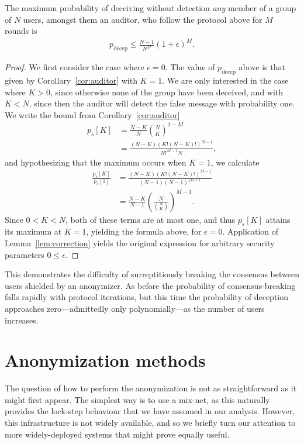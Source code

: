\documentclass[USenglish]{llncs}
\begin{document}
\begin{theorem}\label{thm:transfer-group}
	The maximum probability of deceiving without detection \emph{any} member
	of a group of $N$ users, amongst them an auditor, who follow the
	protocol above for $M$ rounds is
	\begin{align}
		p_\mathrm{decep} \le \frac{N-1}{N^M} (1+\epsilon)^M .
	\end{align}
	\begin{proof}
		We first consider the case where $\epsilon = 0$.
		The value of $p_\mathrm{decep}$ above is that given by
		Corollary~\ref{cor:auditor} with $K = 1$.  We are only interested
		in the case where $K > 0$, since otherwise
		none of the group have been deceived, and with $K < N$,
		since then the auditor will detect the false message with
		probability one.  We write the bound from Corollary~\ref{cor:auditor}
		\begin{align}
			p_s[K] &= \frac{N-K}{N} {N \choose K}^{1-M} \\
			&= \frac{(N-K)(K! (N-K)!)^{M-1}}{N!^{M-1} N} ,
		\end{align}
		and hypothesizing that the maximum occurs
		when $K = 1$, we calculate
		\begin{align}
			\frac{p_s[K]}{p_s[1]}  &= \frac{(N-K)\left(K! (N-K)!\right) ^ {M-1}}{(N-1)(N-1)!^{M-1}} \\
			&= \frac{N-K}{N-1} \left(\frac{N}{{N \choose K}}\right)^{M-1} .
		\end{align}
		Since $0 < K < N$, both of these terms are at most one, and thus $p_s[K]$
		attains its maximum at $K = 1$, yielding the formula above, for $\epsilon = 0$.
		Application of Lemma~\ref{lem:correction} yields the original expression for
arbitrary security parameters $0 \le \epsilon$.
	\end{proof}
\end{theorem}

This demonstrates the difficulty of surreptitiously breaking the consensus between users shielded
by an anonymizer.  As before the probability of consensus-breaking falls rapidly
with protocol iterations, but this time the probability of deception approaches
zero---admittedly only polynomially---as the number of users increases.

\section{Anonymization methods}\label{sec:anonymization}

The question of how to perform the anonymization is not as straightforward
as it might first appear.  The simplest way is to use a mix-net, as this naturally
provides the lock-step behaviour that we have assumed in our analysis.
However, this infrastructure is not widely available, and so we briefly turn our
attention to more widely-deployed systems that might prove equally useful.
\end{document}

